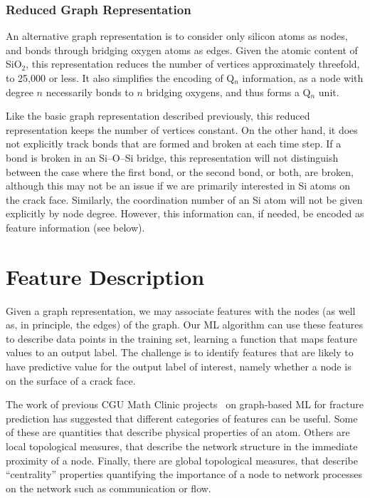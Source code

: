 \subsubsection{Reduced Graph Representation} 

An alternative graph representation is to consider only silicon atoms as nodes, and bonds through bridging oxygen atoms as edges.  Given the atomic content of SiO$_2$, this representation reduces the number of vertices approximately threefold, to 25,000 or less.  It also simplifies the encoding of Q$_n$ information, as a node with degree $n$ necessarily bonds to $n$ bridging oxygens, and thus forms a Q$_n$ unit.

Like the basic graph representation described previously, this reduced representation keeps the number of vertices constant.  On the other hand, it does not explicitly track bonds that are formed and broken at each time step. If a bond is broken in an Si--O--Si bridge, this representation will not distinguish between the case where the first bond, or the second bond, or both, are broken, although this may not be an issue if we are primarily interested in Si atoms on the crack face.  Similarly, the coordination number of an Si atom will not be given explicitly by node degree.  However, this information can, if needed, be encoded as feature information (see below).


\section{Feature Description}
\label{subsec: Features}
Given a graph representation, we may associate features with the nodes (as well as, in principle, the edges) of the graph.  Our ML algorithm can use these features to describe data points in the training set, learning a function that maps feature values to an output label.  The challenge is to identify features that are likely to have predictive value for the output label of interest, namely whether a node is on the surface of a crack face.


The work of previous CGU Math Clinic projects~\cite{valera2018machine,schwarzer2019learning} on graph-based ML for fracture prediction has suggested that different categories of features can be useful. Some of these are quantities that describe physical properties of an atom.  Others are local topological measures, that describe the network structure in the immediate proximity of a node. Finally, there are global topological measures, that describe ``centrality'' properties quantifying the importance of a node to network processes on the network such as communication or flow.

